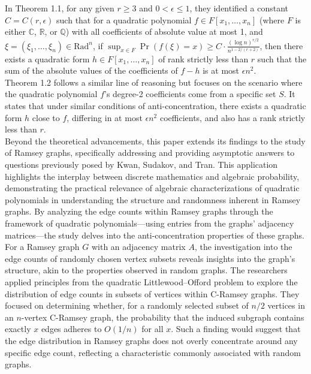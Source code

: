In Theorem 1.1, for any given $r \geq 3$ and $0 < \epsilon \leq 1$, they identified a constant $C = C(r, \epsilon)$ such that for a quadratic polynomial $f \in F[x_1, \dots, x_n]$ (where $F$ is either $\mathbb{C}$, $\mathbb{R}$, or $\mathbb{Q}$) with all coefficients of absolute value at most 1, and $\xi = (\xi_1, \dots, \xi_n) \in \text{Rad}^n$, if ${\sup_{x \in F} \Pr(f(\xi) = x) \geq C \cdot \frac{(\log n)^{r/2}}{n^{1-2/(r+2)}}}$,
then there exists a quadratic form $h \in F[x_1, \dots, x_n]$ of rank strictly less than $r$ such that the sum of the absolute values of the coefficients of $f - h$ is at most $\epsilon n^2$.\\\newline
Theorem 1.2 follows a similar line of reasoning but focuses on the scenario where the quadratic polynomial ${f}$'s degree-2 coefficients come from a specific set $S$. It states that under similar conditions of anti-concentration, there exists a quadratic form $h$ close to ${f}$, differing in at most $\epsilon n^2$ coefficients, and also has a rank strictly less than $r$.\\\newline
Beyond the theoretical advancements, this paper extends its findings to the study of Ramsey graphs, specifically addressing and providing asymptotic answers to questions previously posed by Kwan, Sudakov, and Tran. This application highlights the interplay between discrete mathematics and algebraic probability, demonstrating the practical relevance of algebraic characterizations of quadratic polynomials in understanding the structure and randomness inherent in Ramsey graphs. By analyzing the edge counts within Ramsey graphs through the framework of quadratic polynomials—using entries from the graphs' adjacency matrices—the study delves into the anti-concentration properties of these graphs. For a Ramsey graph $G$ with an adjacency matrix $A$, the investigation into the edge counts of randomly chosen vertex subsets reveals insights into the graph's structure, akin to the properties observed in random graphs. The researchers applied principles from the quadratic Littlewood–Offord problem to explore the distribution of edge counts in subsets of vertices within C-Ramsey graphs. They focused on determining whether, for a randomly selected subset of $n/2$ vertices in an $n$-vertex C-Ramsey graph, the probability that the induced subgraph contains exactly $x$ edges adheres to $O(1/n)$ for all $x$. Such a finding would suggest that the edge distribution in Ramsey graphs does not overly concentrate around any specific edge count, reflecting a characteristic commonly associated with random graphs.
